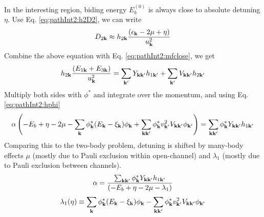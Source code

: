In the interesting region, biding energy $E_{b}^{(0)}$ is always close to absolute detuning $\eta$.   
Use Eq. \ref{eq:pathInt2:h2D2}, we can write 
\begin{equation*}
D_{2\mathbf{k}}\approx{}h_{2\mathbf{k}}\frac{(\epsilon_{\mathbf{k}}-2\mu+\eta)}{u_{\mathbf{k}}^{2}}
\end{equation*}
Combine the above equation with Eq. \ref{eq:pathInt2:mfclose}, we get 
\begin{equation*}
h_{2\mathbf{k}}\frac{(E_{1\mathbf{k}}+E_{3\mathbf{k}})}{u_{\mathbf{k}}^{2}}=\sum_{\mathbf{k}'}{}Y_{\mathbf{k}\mathbf{k}'}h_{1\mathbf{k}'}+\sum_{\mathbf{k}'}V_{\mathbf{k}\mathbf{k}'}h_{2\mathbf{k}'}
\end{equation*}
Multiply both sides with $\phi^{*}$ and integrate over the momentum, and using Eq. \ref{eq:pathInt2:hphi}
\begin{equation}
\alpha\left(-E_{b}+\eta-2\mu-\sum_{\mathbf{k}}{\phi_{\mathbf{k}}^{*}}{(E_{\mathbf{k}}-\xi_{\mathbf{k}})}\phi_{\mathbf{k}}
	+\sum_{\mathbf{k}\mathbf{k}'}{\phi_{\mathbf{k}}^{*}}{v_{\mathbf{k}'}^{2}V_{\mathbf{k}\mathbf{k}'}}\phi_{\mathbf{k}'}\right)
	=\sum_{\mathbf{k}\mathbf{k}'}{\phi_{\mathbf{k}}^{*}}{Y_{\mathbf{k}\mathbf{k}'}}{h_{1\mathbf{k}'}}
\end{equation}
Comparing this to the two-body problem, detuning is shifted by many-body effects $\mu$ (mostly due to Pauli exclusion within open-channel) and $\lambda_{1}$ (mostly due to Pauli exclusion between channels).  
\begin{equation}\label{eq:pathInt2:alpha}
\alpha=\frac{\sum_{\mathbf{k}\mathbf{k}'}{\phi_{\mathbf{k}}^{*}}{Y_{\mathbf{k}\mathbf{k}'}}{h_{1\mathbf{k}'}}}{\left(-E_{b}+\eta-2\mu-\lambda_{1}\right)}
\end{equation}
\begin{equation}\label{eq:pathInt2:lambda1}
\lambda_{1}(\eta)\equiv\sum_{\mathbf{k}}{\phi_{\mathbf{k}}^{*}}{(E_{\mathbf{k}}-\xi_{\mathbf{k}})}\phi_{\mathbf{k}}
	-\sum_{\mathbf{k}\mathbf{k}'}{\phi_{\mathbf{k}}^{*}}{v_{\mathbf{k}'}^{2}V_{\mathbf{k}\mathbf{k}'}}\phi_{\mathbf{k}'}
\end{equation}

